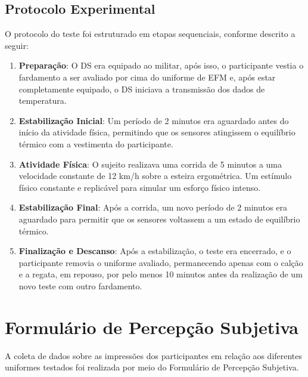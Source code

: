 \subsection{Protocolo Experimental}

O protocolo do teste foi estruturado em etapas sequenciais, conforme descrito a seguir:
\begin{enumerate}
    \item \textbf{Preparação}: O \acrlong{DS} era equipado ao militar, após isso, o participante vestia o fardamento a ser avaliado por cima do uniforme de \acrshort{EFM} e, após estar completamente equipado, o \acrshort{DS} iniciava a transmissão dos dados de temperatura.
    \item \textbf{Estabilização Inicial}: Um período de 2 minutos era aguardado antes do início da atividade física, permitindo que os sensores atingissem o equilíbrio térmico com a vestimenta do participante.
    \item \textbf{Atividade Física}: O sujeito realizava uma corrida de 5 minutos a uma velocidade constante de 12 km/h sobre a esteira ergométrica. Um estímulo físico constante e replicável para simular um esforço físico intenso.
    \item \textbf{Estabilização Final}: Após a corrida, um novo período de 2 minutos era aguardado para permitir que os sensores voltassem a um estado de equilíbrio térmico.
    \item \textbf{Finalização e Descanso}: Após a estabilização, o teste era encerrado, e o participante removia o uniforme avaliado, permanecendo apenas com o calção e a regata, em repouso, por pelo menos 10 minutos antes da realização de um novo teste com outro fardamento.
\end{enumerate}


\section{Formulário de Percepção Subjetiva}

A coleta de dados sobre as impressões dos participantes em relação aos diferentes uniformes testados foi realizada por meio do Formulário de Percepção Subjetiva. %

